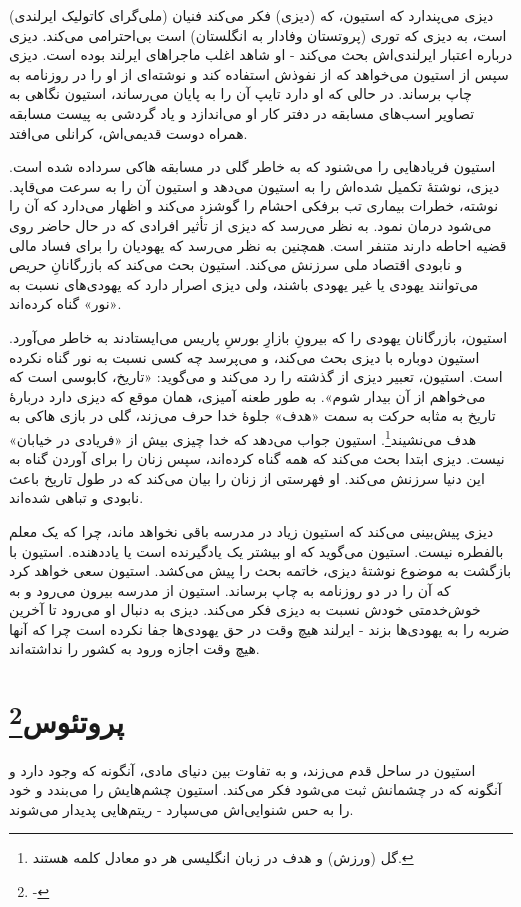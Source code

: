 \documentclass[12pt]{book}
\begin{document}
    دیزی می‌پندارد که استیون، که (دیزی) فکر می‌کند فنیان (ملی‌گرای کاتولیک ایرلندی) است، به دیزی که توری (پروتستان وفادار به انگلستان) است بی‌احترامی می‌کند. دیزی درباره اعتبار ایرلندی‌اش بحث می‌کند - او شاهد اغلب ماجراهای ایرلند بوده است. دیزی سپس از استیون می‌خواهد که از نفوذش استفاده کند و نوشته‌ای از او را در روزنامه به چاپ برساند. در حالی که او دارد تایپ آن را به پایان می‌رساند، استیون نگاهی به تصاویر اسب‌های مسابقه در دفتر کار او می‌اندازد و یاد گردشی به پیست مسابقه همراه دوست قدیمی‌اش، کرانلی می‌افتد.

    استیون فریادهایی را می‌شنود که به خاطر گلی در مسابقه هاکی سرداده شده است. دیزی، نوشتۀ تکمیل شده‌اش را به استیون می‌دهد و استیون آن را به سرعت می‌قاپد. نوشته، خطرات بیماری تب برفکی احشام را گوشزد می‌کند و اظهار می‌دارد که آن را می‌شود درمان نمود. به نظر می‌رسد که دیزی از تأثیر افرادی که در حال حاضر روی قضیه احاطه دارند متنفر است. همچنین به نظر می‌رسد که یهودیان را برای فساد مالی و نابودی اقتصاد ملی سرزنش می‌کند. استیون بحث می‌کند که بازرگانانِ حریص می‌توانند یهودی یا غیر یهودی باشند، ولی دیزی اصرار دارد که یهودی‌های نسبت به «نور» گناه کرده‌اند.

    استیون، بازرگانان یهودی را که بیرونِ بازارِ بورسِ پاریس می‌ایستادند به خاطر می‌آورد. استیون دوباره با دیزی بحث می‌کند، و می‌پرسد چه کسی نسبت به نور گناه نکرده است. استیون، تعبیر دیزی از گذشته را رد می‌کند و می‌گوید: «تاریخ، کابوسی است که می‌خواهم از آن بیدار شوم». به طور طعنه آمیزی، همان موقع که دیزی دارد دربارۀ تاریخ به مثابه حرکت به سمت «هدف» جلوۀ خدا حرف می‌زند، گلی در بازی هاکی به هدف می‌نشیند\footnote{ گل (ورزش) و هدف در زبان انگلیسی هر دو معادل کلمه  هستند.}. استیون جواب می‌دهد که خدا چیزی بیش از «فریادی در خیابان» نیست. دیزی ابتدا بحث می‌کند که همه گناه کرده‌اند، سپس زنان را برای آوردن گناه به این دنیا سرزنش می‌کند. او فهرستی از زنان را بیان می‌کند که در طول تاریخ باعث نابودی و تباهی شده‌اند.

    دیزی پیش‌بینی می‌کند که استیون زیاد در مدرسه باقی نخواهد ماند، چرا که یک معلم بالفطره نیست. استیون می‌گوید که او بیشتر یک یادگیرنده است یا یاددهنده. استیون با بازگشت به موضوع نوشتۀ دیزی، خاتمه بحث را پیش می‌کشد. استیون سعی خواهد کرد که آن را در دو روزنامه به چاپ برساند. استیون از مدرسه بیرون می‌رود و به خوش‌خدمتی خودش نسبت به دیزی فکر می‌کند. دیزی به دنبال او می‌رود تا آخرین ضربه را به یهودی‌ها بزند - ایرلند هیچ وقت در حق یهودی‌ها جفا نکرده است چرا که آنها هیچ وقت اجازه ورود به کشور را نداشته‌اند.

    \chapter[پروتئوس]{پروتئوس\protect\footnote{-}}\label{ep:3}
    استیون در ساحل قدم می‌زند، و به تفاوت بین دنیای مادی، آنگونه که وجود دارد و آنگونه که در چشمانش ثبت می‌شود فکر می‌کند. استیون چشم‌هایش را می‌بندد و خود را به حس شنوایی‌اش می‌سپارد - ریتم‌هایی پدیدار می‌شوند.
\end{document}
